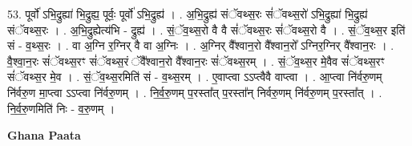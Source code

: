 \documentclass[17pt]{extarticle}
\begin{document}
53. पूर्वो॑ ऽभि॒द्रुह्या॑ भि॒द्रुह्य॒ पूर्वः॒ पूर्वो॑ ऽभि॒द्रुह्य॑ । . अ॒भि॒द्रुह्य॑ संॅवथ्स॒रः सं॑ॅवथ्स॒रो॑ ऽभि॒द्रुह्या॑ भि॒द्रुह्य॑ संॅवथ्स॒रः । . अ॒भि॒द्रुह्येत्य॑भि - द्रुह्य॑ । . सं॒ॅव॒थ्स॒रो वै वै सं॑ॅवथ्स॒रः सं॑ॅवथ्स॒रो वै । . सं॒ॅव॒थ्स॒र इति॑ सं - व॒थ्स॒रः । . वा अ॒ग्नि र॒ग्निर् वै वा अ॒ग्निः । . अ॒ग्निर् वै᳚श्वान॒रो वै᳚श्वान॒रो᳚ ऽग्निर॒ग्निर् वै᳚श्वान॒रः । . वै॒श्वा॒न॒रः सं॑ॅवथ्स॒रꣳ सं॑ॅवथ्स॒रं ॅवै᳚श्वान॒रो वै᳚श्वान॒रः सं॑ॅवथ्स॒रम् । . सं॒ॅव॒थ्स॒र मे॒वैव सं॑ॅवथ्स॒रꣳ सं॑ॅवथ्स॒र मे॒व । . सं॒ॅव॒थ्स॒रमिति॑ सं - व॒थ्स॒रम् । . ए॒वाप्त्वा ऽऽप्त्वैवै वाप्त्वा । . आ॒प्त्वा नि॑र्वरु॒णम् नि॑र्वरु॒ण मा॒प्त्वा ऽऽप्त्वा नि॑र्वरु॒णम् । . नि॒र्व॒रु॒णम् प॒रस्ता᳚त् प॒रस्ता᳚न् निर्वरु॒णम् नि॑र्वरु॒णम् प॒रस्ता᳚त् । . नि॒र्व॒रु॒णमिति॑ निः - व॒रु॒णम् । \newline

\textbf{Ghana Paata } \newline
\end{document}
